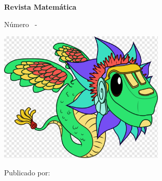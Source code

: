 \begin{titlepage}
    \pagecolor{maincolor}
    \color{white}
    \centering
    \vspace*{2cm}
    {\Huge\bfseries Revista Matemática\par}
    \vspace{1cm}
    {\Large Número \MagazineNumber\ - \MagazineDate \par}
    \vspace{2cm}
    \includegraphics[width=0.6\textwidth]{images/cover/quetzalcoatl.png}
    \vfill
    {\large Publicado por: \MagazinePublisher \par}
    \restoregeometry
\end{titlepage}

\newpage

